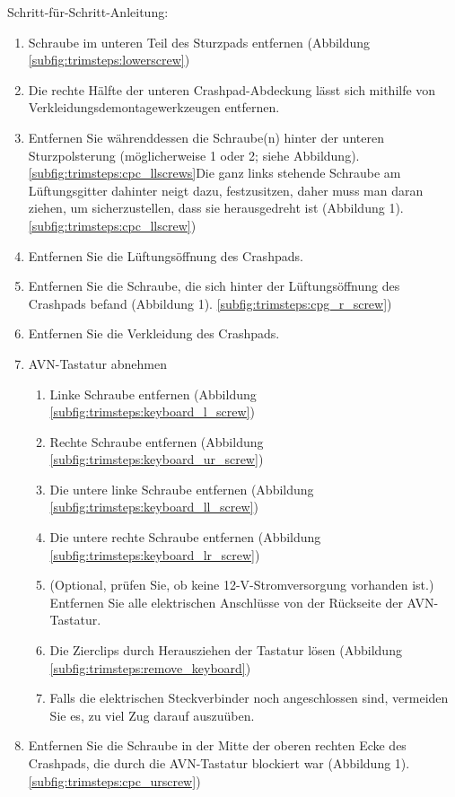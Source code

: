 \documentclass[superscriptaddress,onecolumn,floatfix]{revtex4-2}
\begin{document}
Schritt-für-Schritt-Anleitung:
\begin{enumerate}
  \item Schraube im unteren Teil des Sturzpads entfernen (Abbildung \ref{subfig:trimsteps:lowerscrew})
  \item Die rechte Hälfte der unteren Crashpad-Abdeckung lässt sich mithilfe von Verkleidungsdemontagewerkzeugen entfernen.
  \item Entfernen Sie währenddessen die Schraube(n) hinter der unteren Sturzpolsterung (möglicherweise 1 oder 2; siehe Abbildung). \ref{subfig:trimsteps:cpc_llscrews}Die ganz links stehende Schraube am Lüftungsgitter dahinter neigt dazu, festzusitzen, daher muss man daran ziehen, um sicherzustellen, dass sie herausgedreht ist (Abbildung 1). \ref{subfig:trimsteps:cpc_llscrew})
  \item Entfernen Sie die Lüftungsöffnung des Crashpads.
  \item Entfernen Sie die Schraube, die sich hinter der Lüftungsöffnung des Crashpads befand (Abbildung 1). \ref{subfig:trimsteps:cpg_r_screw})
  \item Entfernen Sie die Verkleidung des Crashpads.
  \item AVN-Tastatur abnehmen 
    \begin{enumerate}
      \item Linke Schraube entfernen (Abbildung \ref{subfig:trimsteps:keyboard_l_screw})
      \item Rechte Schraube entfernen (Abbildung \ref{subfig:trimsteps:keyboard_ur_screw})
      \item Die untere linke Schraube entfernen (Abbildung \ref{subfig:trimsteps:keyboard_ll_screw})
      \item Die untere rechte Schraube entfernen (Abbildung \ref{subfig:trimsteps:keyboard_lr_screw})
      \item (Optional, prüfen Sie, ob keine 12-V-Stromversorgung vorhanden ist.) Entfernen Sie alle elektrischen Anschlüsse von der Rückseite der AVN-Tastatur.
      \item Die Zierclips durch Herausziehen der Tastatur lösen (Abbildung \ref{subfig:trimsteps:remove_keyboard})
      \item Falls die elektrischen Steckverbinder noch angeschlossen sind, vermeiden Sie es, zu viel Zug darauf auszuüben.
    \end{enumerate}
  \item Entfernen Sie die Schraube in der Mitte der oberen rechten Ecke des Crashpads, die durch die AVN-Tastatur blockiert war (Abbildung 1). \ref{subfig:trimsteps:cpc_urscrew})

\end{enumerate}
\end{document}
